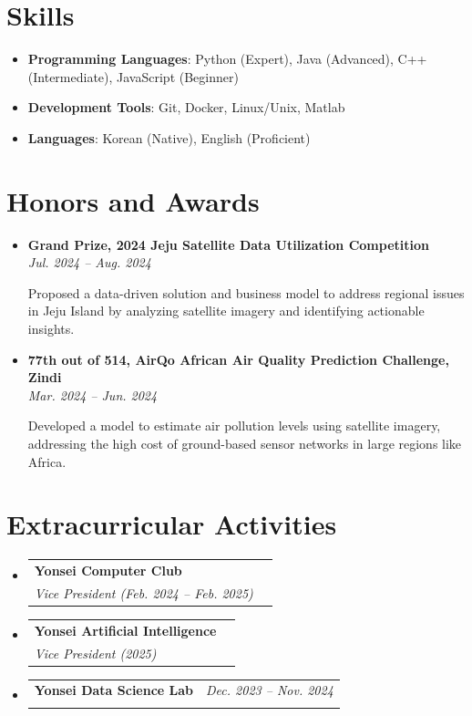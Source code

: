 \documentclass[letterpaper,11pt]{article}
\makeatletter
\newcommand{\resumeAwards}[3]{\item\small{\textbf{#1}\\\textit{#2}\\#3}\vspace{2pt}}
\newcommand{\resumeCommunity}[3]{
  \vspace{-1pt}\item
    \begin{tabular*}{0.97\textwidth}[t]{l@{\extracolsep{\fill}}r}
      \textbf{#1} & #2 \\
      \textit{\small#3} \\
    \end{tabular*}\vspace{-5pt}
}
\newcommand{\resumeResearch}[5]{
  \vspace{-1pt}\item
    \begin{tabular*}{0.97\textwidth}[t]{l@{\extracolsep{\fill}}r}
      \textbf{#1} & #2 \\
      \textit{\small#3} {\small #4 \vspace{-2pt}} & \textit{\small #5} \\
    \end{tabular*}\vspace{-5pt}
}
\newcommand{\resumeSkills}[1]{\item\small #1}
\newcommand{\resumeSubHeadingListStart}{\begin{itemize}[leftmargin=*]}
\newcommand{\resumeSubHeadingListEnd}{\end{itemize}}
\makeatother
\begin{document}
 
\section{Skills}
  \resumeSubHeadingListStart
    \resumeSkills{\textbf{Programming Languages}: Python (Expert), Java (Advanced), C++ (Intermediate), JavaScript (Beginner)}
    \resumeSkills{\textbf{Development Tools}: Git, Docker, Linux/Unix, Matlab}
    \resumeSkills{\textbf{Languages}: Korean (Native), English (Proficient)}
  \resumeSubHeadingListEnd
  
\section{Honors and Awards}
  \resumeSubHeadingListStart
    \resumeAwards
      {Grand Prize, 2024 Jeju Satellite Data Utilization Competition}
      {Jul. 2024 -- Aug. 2024}
      {\parbox[t]{0.7\textwidth}{Proposed a data-driven solution and business model to address regional issues in Jeju Island by analyzing satellite imagery and identifying actionable insights.}}
    
    \resumeAwards
      {77th out of 514, AirQo African Air Quality Prediction Challenge, Zindi}
      {Mar. 2024 -- Jun. 2024}
      {\parbox[t]{0.7\textwidth}{Developed a model to estimate air pollution levels using satellite imagery, addressing the high cost of ground-based sensor networks in large regions like Africa.}}
    \resumeSubHeadingListEnd
    
  
\section{Extracurricular Activities}
  \resumeSubHeadingListStart
    \resumeCommunity{Yonsei Computer Club}{}
    {Vice President (Feb. 2024 -- Feb. 2025)}
    
    \resumeCommunity{Yonsei Artificial Intelligence}{}
    {Vice President (2025)}
    
    \resumeCommunity{Yonsei Data Science Lab}{\textit{Dec. 2023 -- Nov. 2024}}
    {}
  \resumeSubHeadingListEnd




\end{document}
